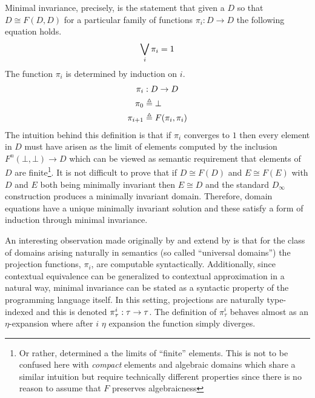Minimal invariance, precisely, is the statement that given a $D$ so
that $D \cong F(D, D)$ for a particular family of functions $\pi_i : D
\to D$ the following equation holds.
\[
  \bigvee_i \pi_i = 1
\]
The function $\pi_i$ is determined by induction on $i$.
\begin{align*}
  \pi_i &: D \to D\\
  \pi_0 &\mathrel{\triangleq} \bot\\
  \pi_{i + 1} &\mathrel{\triangleq} F(\pi_i, \pi_i)
\end{align*}
The intuition behind this definition is that if $\pi_i$ converges to
$1$ then every element in $D$ must have arisen as the limit of
elements computed by the inclusion $F^n(\bot, \bot) \to D$ which can
be viewed as semantic requirement that elements of $D$ are
finite\footnote{Or rather, determined a the limits of ``finite''
  elements. This is not to be confused here with \emph{compact} elements and
  algebraic domains which share a similar intuition but require
  technically different properties since there is no reason to assume
  that $F$ preserves algebraicness}. It is not difficult to prove that
if $D \cong F(D)$ and $E \cong F(E)$ with $D$ and $E$ both being
minimally invariant then $E \cong D$ and the standard $D_\infty$
construction produces a minimally invariant domain. Therefore, domain
equations have a unique minimally invariant solution and these satisfy
a form of induction through minimal invariance.

An interesting observation made originally by
\citet{TODO-BIRKEDAL-AND-HARPER} and extend by
\citet{TODO-CRARY-AND-HARPER} is that for the class of domains arising
naturally in semantics (so called ``universal domains'') the
projection functions, $\pi_i$, are computable
syntactically. Additionally, since contextual equivalence can be
generalized to contextual approximation in a natural way, minimal
invariance can be stated as a syntactic property of the programming
language itself. In this setting, projections are naturally
type-indexed and this is denoted $\pi_\tau^i : \tau \to \tau$. The
definition of $\pi_\tau^i$ behaves almost as an $\eta$-expansion where
after $i$ $\eta$ expansion the function simply diverges.

